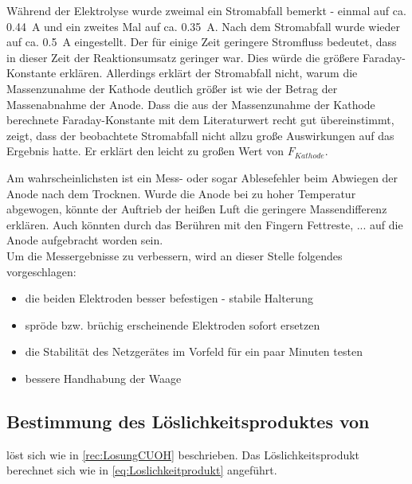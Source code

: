 \documentclass{article}
\begin{document}
        Während der Elektrolyse wurde zweimal ein Stromabfall bemerkt - einmal auf ca. \SI[mode=text]{0.44}{\ampere} und ein zweites Mal auf ca. \SI[mode=text]{0.35}{\ampere}. Nach dem Stromabfall wurde wieder auf ca. \SI[mode=text]{0.5}{\ampere} eingestellt. Der für einige Zeit geringere Stromfluss bedeutet, dass in dieser Zeit der Reaktionsumsatz geringer war. Dies würde die größere Faraday-Konstante erklären. Allerdings erklärt der Stromabfall nicht, warum die Massenzunahme der Kathode deutlich größer ist wie der Betrag der Massenabnahme der Anode. Dass die aus der Massenzunahme der Kathode berechnete Faraday-Konstante mit dem Literaturwert recht gut übereinstimmt, zeigt, dass der beobachtete Stromabfall nicht allzu große Auswirkungen auf das Ergebnis hatte. Er erklärt den leicht zu großen Wert von $F_{Kathode}$.
        
        Am wahrscheinlichsten ist ein Mess- oder sogar Ablesefehler beim Abwiegen der Anode nach dem Trocknen. Wurde die Anode bei zu hoher Temperatur abgewogen, könnte der Auftrieb der heißen Luft die geringere Massendifferenz erklären. Auch könnten durch das Berühren mit den Fingern Fettreste, ... auf die Anode aufgebracht worden sein. \\
        
        Um die Messergebnisse zu verbessern, wird an dieser Stelle folgendes vorgeschlagen: 
      
      \begin{itemize}
        \item die beiden Elektroden besser befestigen - stabile Halterung
        \item spröde bzw. brüchig erscheinende Elektroden sofort ersetzen
        \item die Stabilität des Netzgerätes im Vorfeld für ein paar Minuten testen
        \item bessere Handhabung der Waage 
      \end{itemize}
        
    \pagebreak
    
    \subsection{Bestimmung des Löslichkeitsproduktes von }
      
       löst sich wie in \ref{rec:LosungCUOH} beschrieben. Das Löslichkeitsprodukt berechnet sich wie in \eqref{eq:Loslichkeitprodukt} angeführt.  
      
\end{document}
